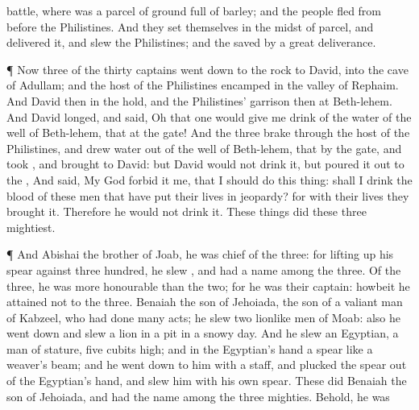 {battle, where was a
parcel of
ground
full of
barley; and the
people
fled from
before the
Philistines.
And they
set themselves in the
midst of
{}
parcel, and
delivered it, and
slew the
Philistines; and the
{}
saved
{} by a
great
deliverance.
\par }{\PP {}¶ Now
three of the
thirty
captains went
down to the
rock to
David, into the
cave of
Adullam; and the
host of the
Philistines
encamped in the
valley of
Rephaim.
And
David
{} then in the
hold, and the
Philistines’
garrison
{} then at
Beth-lehem.
And
David
longed, and
said, Oh that one would give me
drink of the
water of the
well of
Beth-lehem, that
{} at the
gate!
And the
three brake
through the
host of the
Philistines, and
drew
water out of the
well of
Beth-lehem, that
{} by the
gate, and
took
{}, and
brought
{} to
David: but
David
would not
drink
{} it, but poured it
out to the
{},
And
said, My
God
forbid it me, that I should
do this
thing: shall I
drink the
blood of these
men that have put their lives in
jeopardy? for with
{} their
lives they
brought it. Therefore he
would not
drink it. These things
did these
three
mightiest.
\par }{\PP {}¶ And
Abishai the
brother of
Joab, he was
chief of the
three: for lifting
up his
spear against
three
hundred, he
slew
{}, and had a
name among the
three.
Of the
three, he was more
honourable than the
two; for he was their
captain: howbeit he
attained not to the
{}
three.
Benaiah the
son of
Jehoiada, the
son of a
valiant
man of
Kabzeel, who had done
many
acts; he
slew
two lionlike
men of
Moab: also he went
down and
slew a
lion
in a
pit in a
snowy
day.
And he
slew an
Egyptian, a
man of
{}
stature,
five
cubits high; and in the
Egyptian’s
hand
{} a
spear like a
weaver’s
beam; and he went
down to him with a
staff, and
plucked the
spear out of the
Egyptian’s
hand, and
slew him with his own
spear.
These
{}
did
Benaiah the
son of
Jehoiada, and had the
name among the
three
mighties.
Behold, he was
}
